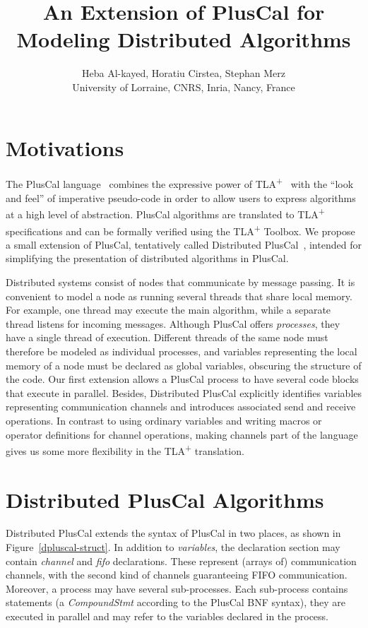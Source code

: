 \documentclass{article}
\title{An Extension of PlusCal for Modeling Distributed Algorithms}
\author{%
  Heba Al-kayed, Horatiu Cirstea, Stephan Merz\\
  University of Lorraine, CNRS, Inria, Nancy, France%
}
\date{}
\newcommand{\tlaplus}{TLA\textsuperscript{+}\xspace}
\begin{document}

\maketitle


\section{Motivations}

The PlusCal language~\cite{pcalAlgo,wayne:practical} combines the expressive power of \tlaplus~\cite{tlabook} with the ``look and feel'' of imperative pseudo-code in order to allow users to express algorithms at a high level of abstraction. PlusCal algorithms are translated to \tlaplus specifications and can be formally verified using the \tlaplus Toolbox. We propose a small extension of PlusCal, tentatively called Distributed PlusCal~\cite{dpluscal}, intended for simplifying the presentation of distributed algorithms in PlusCal.

Distributed systems consist of nodes that communicate by message
passing. It is convenient to model a node as running several threads
that share local memory. For example, one thread may execute the main
algorithm, while a separate thread listens for incoming
messages. Although PlusCal offers \emph{processes}, they have a single
thread of execution. Different threads of the same node must therefore
be modeled as individual processes, and variables representing the
local memory of a node must be declared as global variables, obscuring
the structure of the code. Our first extension allows a PlusCal
process to have several code blocks that execute in parallel. Besides,
Distributed PlusCal explicitly identifies variables representing
communication channels and introduces associated send and receive
operations. In contrast to using ordinary variables and writing macros
or operator definitions for channel operations, making channels part
of the language gives us some more flexibility in the \tlaplus
translation. 


\section{Distributed PlusCal Algorithms}

Distributed PlusCal extends the syntax of PlusCal in two places, as shown in Figure~\ref{dpluscal-struct}. In addition to \emph{variables}, the declaration section may contain \emph{channel} and \emph{fifo} declarations. These represent (arrays of) communication channels, with the second kind of channels guaranteeing FIFO communication. Moreover, a process may have several sub-processes. Each sub-process contains statements (a \emph{CompoundStmt} according to the PlusCal BNF syntax), they are executed in parallel and may refer to the variables declared in the process.
\end{document}

